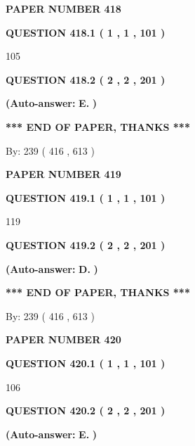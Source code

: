 \documentclass{ctexart}
\begin{document}
   
 {\textbf{ \Large{ PAPER NUMBER  418  }}}
   
   
   
   
  
  
{\textbf{\large{QUESTION
418.1 
 ( 1 , 1 , 101 )
}}}

105
  
  
{\textbf{\large{QUESTION
418.2 
 ( 2 , 2 , 201 )
}}}
 
 
{\textbf{(Auto-answer:}}
{\textbf{\large{
E.}}}
{\textbf{)}}
 
 
   
   
   
   
\vspace{1.0in} 
{\textbf{\large{ *** END OF PAPER, THANKS *** }}} 
   
   
\hspace{1.0in} By: 
 239 ( 416 ,  613 )
   
   
   
   
\newpage 
\setcounter{page}{ 
   419001 } 
   
   
 {\textbf{ \Large{ PAPER NUMBER  419  }}}
   
   
   
   
  
  
{\textbf{\large{QUESTION
419.1 
 ( 1 , 1 , 101 )
}}}

119
  
  
{\textbf{\large{QUESTION
419.2 
 ( 2 , 2 , 201 )
}}}
 
 
{\textbf{(Auto-answer:}}
{\textbf{\large{
D.}}}
{\textbf{)}}
 
 
   
   
   
   
\vspace{1.0in} 
{\textbf{\large{ *** END OF PAPER, THANKS *** }}} 
   
   
\hspace{1.0in} By: 
 239 ( 416 ,  613 )
   
   
   
   
\newpage 
\setcounter{page}{ 
   420001 } 
   
   
 {\textbf{ \Large{ PAPER NUMBER  420  }}}
   
   
   
   
  
  
{\textbf{\large{QUESTION
420.1 
 ( 1 , 1 , 101 )
}}}

106
  
  
{\textbf{\large{QUESTION
420.2 
 ( 2 , 2 , 201 )
}}}
 
 
{\textbf{(Auto-answer:}}
{\textbf{\large{
E.}}}
{\textbf{)}}
 
\end{document}
